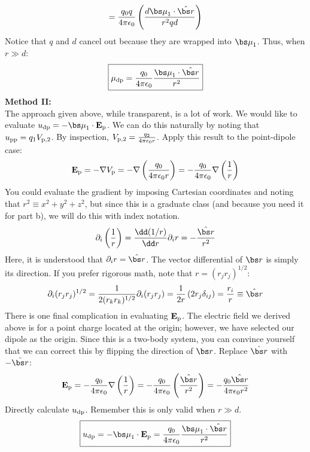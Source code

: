 {\[ = \frac{q_0 q}{4 \pi \epsilon_0} 
   \left( \frac{d \bmu_1 \cdot \hat{\bs r}}{r^2 q d} \right)
   \]
Notice that $q$ and $d$ cancel out because they
are wrapped into $\bmu_1$. Thus, when $r \gg d$:
\[ \boxed{ \mu_{\rm dp} = \frac{q_0}{4 \pi \epsilon_0} 
                          \frac{\bmu_1 \cdot \hat{\bs r}}{r^2} } \]
{\bf Method II: } \\
The approach given above, while transparent, 
is a lot of work. 
We would like to evaluate $u_{\rm dp} = -\bmu_1 \cdot {\bf E}_{\rm p}$.
We can do this naturally by noting that $u_{\rm pp} = q_1 V_{\rm p,2}$.
By inspection, $V_{\rm p,2} = \frac{q_2}{4 \pi \epsilon_0 r}$.
Apply this result to the point-dipole case:
\[ {\bf E}_{\rm p} = -\nabla V_{\rm p} 
 = -\nabla \left( \frac{q_0}{4 \pi \epsilon_0 r} \right) 
 = -\frac{q_0}{4 \pi \epsilon_0} \nabla \left( \frac{1}{r} \right) \]
You could evaluate the gradient by imposing
Cartesian coordinates and noting that $r^2 \equiv x^2 + y^2 + z^2$,
but since this is a graduate class (and because you need it for part b),
we will do this with index notation.
\[ \partial_i \left( \frac{1}{r} \right) 
 = \frac{\dd (1/r)}{\dd r} \partial_i r 
 = -\frac{\hat{\bs r}}{r^2} \]
Here, it is understood that $\partial_i r = \hat{\bs r}$.
The vector differential of ${\bs r}$ is simply its direction.
If you prefer rigorous math, note that $r = (r_j r_j)^{1/2}$:
\[ \partial_i (r_j r_j)^{1/2} 
 = \frac{1}{2 (r_k r_k)^{1/2}} \partial_i (r_j r_j) 
 = \frac{1}{2r} \left( 2 r_j \delta_{ij} \right)
 = \frac{r_i}{r} \equiv \hat{\bs r} \]
There is one final complication in evaluating ${\bf E}_{\rm p}$.
The electric field we derived above is for 
a point charge located at the origin;
however, we have selected our dipole as the origin.
Since this is a two-body system, you can convince yourself
that we can correct this by flipping the direction of ${\bs r}$.
Replace $\hat{\bs r}$ with $-\hat{\bs r}$:
\[ {\bf E}_{\rm p} 
 = -\frac{q_0}{4 \pi \epsilon_0} \nabla \left( \frac{1}{r} \right) 
 = -\frac{q_0}{4 \pi \epsilon_0} \left( \frac{\hat{\bs r}}{r^2}\right)
 = -\frac{q_0 \hat{\bs r}}{4 \pi \epsilon_0 r^2}\]
Directly calculate $u_{\rm dp}$.
Remember this is only valid when $r \gg d$.
\[ \boxed{ u_{\rm dp} = -\bmu_1 \cdot {\bf E}_{\rm p} 
 = \frac{q_0}{4\pi \epsilon_0} \frac{\bmu_1 \cdot \hat{\bs r}}{r^2} } \]
}

